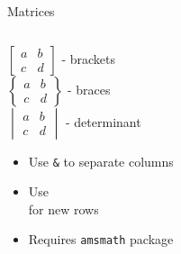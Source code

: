 \begin{frame}[fragile]{Matrices}
\begin{columns}
\begin{column}{0.5\textwidth}
\begin{center}
                $\begin{bmatrix} a & b \\ c & d \end{bmatrix}$ - brackets\\[10pt]
                
                $\begin{Bmatrix} a & b \\ c & d \end{Bmatrix}$ - braces\\[10pt]
                
                $\begin{vmatrix} a & b \\ c & d \end{vmatrix}$ - determinant
            \end{center}
            
            \begin{itemize}
                \item Use \texttt{\&} to separate columns
                \item Use \texttt{\\} for new rows
                \item Requires \texttt{amsmath} package
            \end{itemize}
        \end{column}
    \end{columns}
\end{frame}

